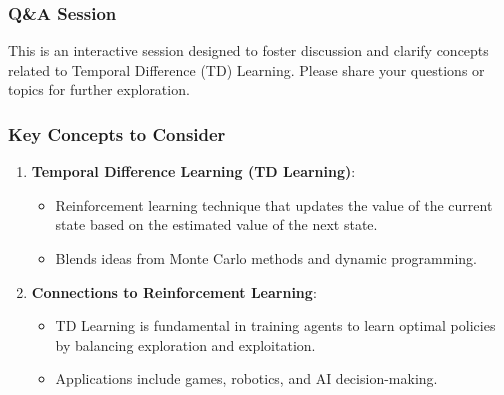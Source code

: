 \documentclass[aspectratio=169]{beamer}
\begin{document}
\begin{frame}[fragile]
    \frametitle{Q\&A Session}
    This is an interactive session designed to foster discussion and clarify concepts related to Temporal Difference (TD) Learning. Please share your questions or topics for further exploration.
\end{frame}

\begin{frame}[fragile]
    \frametitle{Key Concepts to Consider}
    \begin{enumerate}
        \item \textbf{Temporal Difference Learning (TD Learning)}:
            \begin{itemize}
                \item Reinforcement learning technique that updates the value of the current state based on the estimated value of the next state.
                \item Blends ideas from Monte Carlo methods and dynamic programming.
            \end{itemize}
        
        \item \textbf{Connections to Reinforcement Learning}:
            \begin{itemize}
                \item TD Learning is fundamental in training agents to learn optimal policies by balancing exploration and exploitation.
                \item Applications include games, robotics, and AI decision-making.
            \end{itemize}
    \end{enumerate}
\end{frame}
\end{document}
